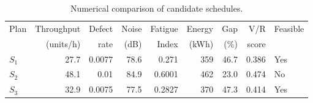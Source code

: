 \begin{table}[htbp]
\centering
\caption{Numerical comparison of candidate schedules.}
\label{tab:numerical-sim}
\small
\begin{tabular}{@{}lrrrrrrrl@{}}
\toprule
Plan & Throughput & Defect & Noise & Fatigue & Energy & Gap & V/R & Feasible \\
     & (units/h)  & rate   & (dB)  & Index   & (kWh)  & (\%) & score &         \\
\midrule
$S_{1}$ & 27.7 & 0.0077 & 78.6 & 0.271 & 359 & 46.7 & 0.386 & Yes \\
$S_{2}$ & 48.1 & 0.01 & 84.9 & 0.6001 & 462 & 23.0 & 0.474 & No \\
$S_{3}$ & 32.9 & 0.0075 & 77.5 & 0.2827 & 370 & 47.3 & 0.414 & Yes \\
\bottomrule
\end{tabular}
\end{table}
